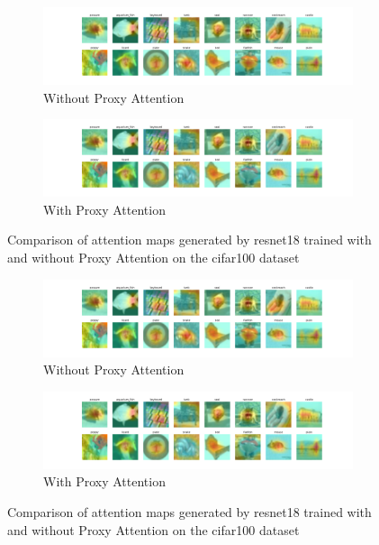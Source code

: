     \begin{figure}[!htb]
        \centering
        \begin{subfigure}[b]{1\textwidth}
            \includegraphics[width=\textwidth]{images/cifar100_resnet18_noproxy_0.pdf}
            \caption{Without Proxy Attention}
        \end{subfigure}
        \hfill
        \begin{subfigure}[b]{1\textwidth}
            \includegraphics[width=\textwidth]{images/cifar100_resnet18_proxy_0.pdf}
            \caption{With Proxy Attention}
        \end{subfigure}
        \caption{Comparison of attention maps generated by resnet18 trained with and without Proxy Attention on the cifar100 dataset}
    \end{figure}
    

    \begin{figure}[!htb]
        \centering
        \begin{subfigure}[b]{1\textwidth}
            \includegraphics[width=\textwidth]{images/cifar100_resnet18_noproxy_0.pdf}
            \caption{Without Proxy Attention}
        \end{subfigure}
        \hfill
        \begin{subfigure}[b]{1\textwidth}
            \includegraphics[width=\textwidth]{images/cifar100_resnet18_proxy_0.pdf}
            \caption{With Proxy Attention}
        \end{subfigure}
        \caption{Comparison of attention maps generated by resnet18 trained with and without Proxy Attention on the cifar100 dataset}
    \end{figure}
    
